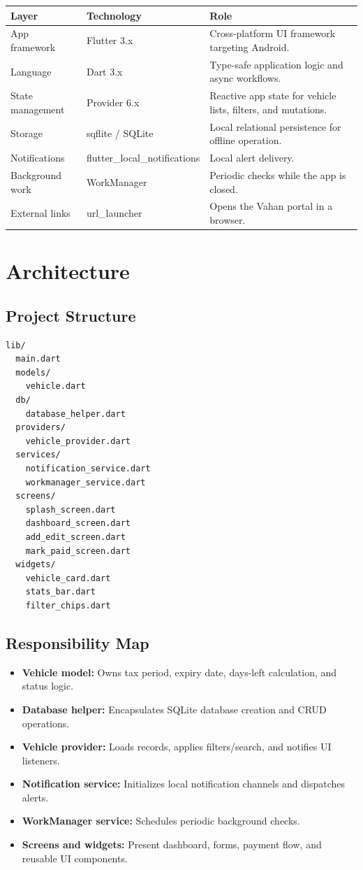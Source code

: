 \documentclass[11pt,a4paper]{article}
\begin{document}
\begin{longtable}{p{} p{} p{}}
\toprule
\textbf{Layer} & \textbf{Technology} & \textbf{Role} \\
\midrule
App framework & Flutter 3.x & Cross-platform UI framework targeting Android. \\
Language & Dart 3.x & Type-safe application logic and async workflows. \\
State management & Provider 6.x & Reactive app state for vehicle lists, filters, and mutations. \\
Storage & sqflite / SQLite & Local relational persistence for offline operation. \\
Notifications & flutter\_local\_notifications & Local alert delivery. \\
Background work & WorkManager & Periodic checks while the app is closed. \\
External links & url\_launcher & Opens the Vahan portal in a browser. \\
\bottomrule
\end{longtable}

\section{Architecture}

\subsection{Project Structure}
\begin{lstlisting}
lib/
  main.dart
  models/
    vehicle.dart
  db/
    database_helper.dart
  providers/
    vehicle_provider.dart
  services/
    notification_service.dart
    workmanager_service.dart
  screens/
    splash_screen.dart
    dashboard_screen.dart
    add_edit_screen.dart
    mark_paid_screen.dart
  widgets/
    vehicle_card.dart
    stats_bar.dart
    filter_chips.dart
\end{lstlisting}

\subsection{Responsibility Map}
\begin{itemize}[leftmargin=*]
  \item \textbf{Vehicle model:} Owns tax period, expiry date, days-left calculation, and status logic.
  \item \textbf{Database helper:} Encapsulates SQLite database creation and CRUD operations.
  \item \textbf{Vehicle provider:} Loads records, applies filters/search, and notifies UI listeners.
  \item \textbf{Notification service:} Initializes local notification channels and dispatches alerts.
  \item \textbf{WorkManager service:} Schedules periodic background checks.
  \item \textbf{Screens and widgets:} Present dashboard, forms, payment flow, and reusable UI components.
\end{itemize}
\end{document}
